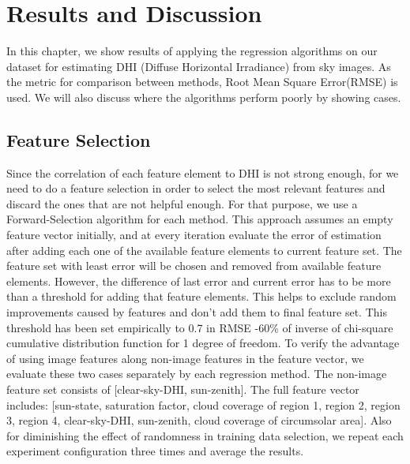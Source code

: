 \chapter{Results and Discussion}
In this chapter, we show results of applying the regression algorithms on our dataset for estimating DHI (Diffuse Horizontal Irradiance) from sky images. As the metric for comparison between methods, Root Mean Square Error(RMSE) is used. We will also discuss where the algorithms perform poorly by showing cases.

\section{Feature Selection}
Since the correlation of each feature element to DHI is not strong enough, for we need to do a feature selection in order to select the most relevant features and discard the ones that are not helpful enough. For that purpose, we use a Forward-Selection algorithm for each method. This approach assumes an empty feature vector initially, and at every iteration evaluate the error of estimation after adding each one of the available feature elements to current feature set. The feature set with least error will be chosen and removed from available feature elements. However, the difference of last error and current error has to be more than a threshold for adding that feature elements. This helps to exclude random improvements caused by features and don't add them to final feature set. This threshold has been set empirically to 0.7 in RMSE -60\% of inverse of chi-square cumulative distribution function for 1 degree of freedom. 
\newline
To verify the advantage of using image features along non-image features in the feature vector, we evaluate these two cases separately by each regression method. The non-image feature set consists of [clear-sky-DHI, sun-zenith]. The full feature vector includes: [sun-state, saturation factor, cloud coverage of region 1, region 2, region 3, region 4, clear-sky-DHI, sun-zenith, cloud coverage of circumsolar area]. Also for diminishing the effect of randomness in training data selection, we repeat each experiment configuration three times and average the results.

